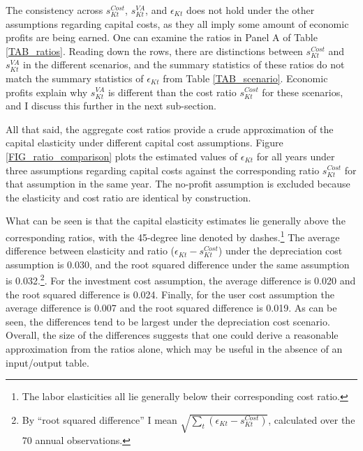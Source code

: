 \documentclass[11pt]{article}
\begin{document}
The consistency across $s^{Cost}_{Kt}$, $s^{VA}_{Kt}$, and $\epsilon_{Kt}$ does not hold under the other assumptions regarding capital costs, as they all imply some amount of economic profits are being earned. One can examine the ratios in Panel A of Table \ref{TAB_ratios}. Reading down the rows, there are distinctions between $s^{Cost}_{Kt}$ and $s^{VA}_{Kt}$ in the different scenarios, and the summary statistics of these ratios do not match the summary statistics of $\epsilon_{Kt}$ from Table \ref{TAB_scenario}. Economic profits explain why $s^{VA}_{Kt}$ is different than the cost ratio $s^{Cost}_{Kt}$ for these scenarios, and I discuss this further in the next sub-section.

All that said, the aggregate cost ratios provide a crude approximation of the capital elasticity under different capital cost assumptions. Figure \ref{FIG_ratio_comparison} plots the estimated values of $\epsilon_{Kt}$ for all years under three assumptions regarding capital costs against the corresponding ratio $s^{Cost}_{Kt}$ for that assumption in the same year. The no-profit assumption is excluded because the elasticity and cost ratio are identical by construction.

What can be seen is that the capital elasticity estimates lie generally above the corresponding ratios, with the 45-degree line denoted by dashes.\footnote{The labor elasticities all lie generally below their corresponding cost ratio.} The average difference between elasticity and ratio ($\epsilon_{Kt} - s^{Cost}_{Kt}$) under the depreciation cost assumption is 0.030, and the root squared difference under the same assumption is 0.032.\footnote{By ``root squared difference'' I mean $\sqrt{\sum_t (\epsilon_{Kt} - s^{Cost}_{Kt})}$, calculated over the 70 annual observations.}. For the investment cost assumption, the average difference is 0.020 and the root squared difference is 0.024. Finally, for the user cost assumption the average difference is 0.007 and the root squared difference is 0.019. As can be seen, the differences tend to be largest under the depreciation cost scenario. Overall, the size of the differences suggests that one could derive a reasonable approximation from the ratios alone, which may be useful in the absence of an input/output table.
\end{document}
